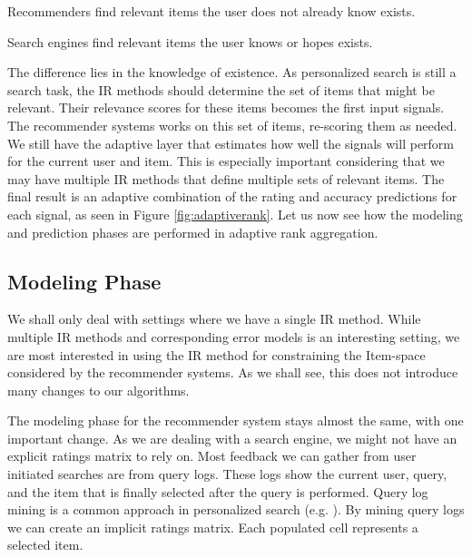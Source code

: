 \clearpage

\begin{itemize*}
  \item Recommenders find relevant items the user does not already know exists.
  \item Search engines find relevant items the user knows or hopes exists.
\end{itemize*}

The difference lies in the knowledge of existence.
As personalized search is still a search task, the IR methods should determine the set of items that might be relevant.
Their relevance scores for these items becomes the first input signals.
The recommender systems works on this set of items, re-scoring them as needed.
We still have the adaptive layer that estimates how well the signals will perform for the current user and item.
This is especially important considering that we may have multiple IR methods that define multiple sets of relevant items.
The final result is an adaptive combination of the rating and accuracy predictions for each signal,
as seen in Figure \ref{fig:adaptiverank}.
Let us now see how the modeling and prediction phases are performed in adaptive rank aggregation.



\subsection{Modeling Phase}

We shall only deal with settings where we have a single IR method.
While multiple IR methods and corresponding error models is an interesting
setting, we are most interested in using the IR method for constraining the Item-space considered by the recommender systems.
As we shall see, this does not introduce many changes to our algorithms.

The modeling phase for the recommender system stays almost the same, with one important change.
As we are dealing with a search engine, we might not have an explicit ratings matrix to rely on.
Most feedback we can gather from user initiated searches are from query logs.
These logs show the current user, query, and the item that is finally selected after the query is performed.
Query log mining is a common approach in personalized search
(e.g. \cite{Liu2002, Sugiyama2004, Shen2005, Speretta2000}).
By mining query logs we can create an implicit ratings matrix.
Each populated cell represents a selected item.


